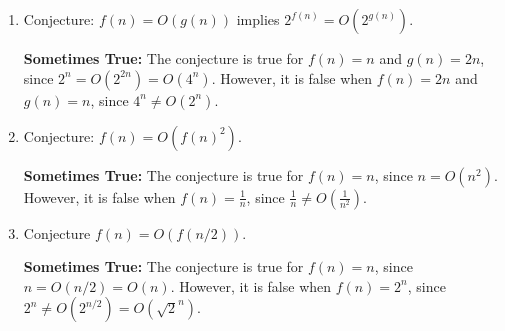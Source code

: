 \documentclass[letterpaper,11pt]{article}
\begin{document}
\begin{enumerate}
\begin{enumerate}
        \item Conjecture: $f(n) = O(g(n))$ implies $2^{f(n)} = O(2^{g(n)})$.

        {\bf Sometimes True:} The conjecture is true for $f(n) = n$ and $g(n) = 2n$, since $2^n = O(2^{2n}) = O(4^n)$. However, it is false when $f(n) = 2n$ and $g(n)=n$, since $4^n \neq O(2^n)$.

        \item Conjecture: $f(n) = O(f(n)^2)$.

        {\bf Sometimes True:} The conjecture is true for $f(n) = n$, since $n = O(n^2)$. However, it is false when $f(n)=\frac{1}{n}$, since $\frac{1}{n} \neq O\left(\frac{1}{n^2}\right)$.
        \item Conjecture $f(n) = O(f(n/2))$.

        {\bf Sometimes True:} The conjecture is true for $f(n) = n$, since $n = O(n/2) = O(n)$. However, it is false when $f(n)=2^n$, since $2^n \neq O(2^{n/2}) = O(\sqrt{2}^n)$.
    \end{enumerate}



\end{enumerate}
\end{document}
